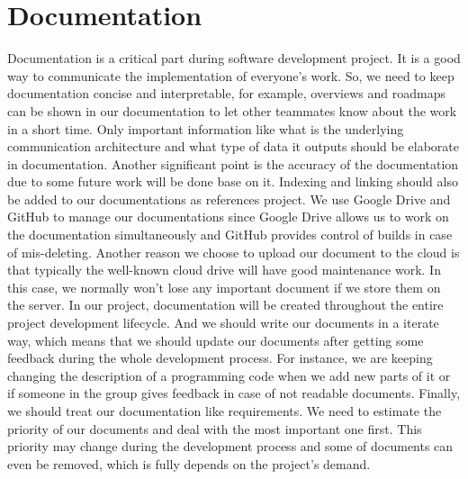 \documentclass[11pt, titlepage]{article} %
\begin{document}
\section{Documentation}
Documentation is a critical part during software development project. It is
a good way to communicate the implementation of everyone's work. So, we
need to keep documentation concise and interpretable, for example, overviews
and roadmaps can be shown in our documentation to let other teammates
know about the work in a short time. Only important information like what is
the underlying communication architecture and what type of data it outputs
should be elaborate in documentation. Another significant point is the
accuracy of the documentation due to some future work will be done base on
it. Indexing and linking should also be added to our documentations as
references project.
We use Google Drive and GitHub to manage our documentations since
Google Drive allows us to work on the documentation simultaneously and
GitHub provides control of builds in case of mis-deleting. Another reason we
choose to upload our document to the cloud is that typically the well-known
cloud drive will have good maintenance work. In this case, we normally won’t
lose any important document if we store them on the server.
In our project, documentation will be created throughout the entire project
development lifecycle. And we should write our documents in a iterate way,
which means that we should update our documents after getting some
feedback during the whole development process. For instance, we are
keeping changing the description of a programming code when we add new
parts of it or if someone in the group gives feedback in case of not
readable documents. Finally, we should treat our documentation like
requirements. We need to estimate the priority of our documents and deal
with the most important one first. This priority may change during the
development process and some of documents can even be removed, which
is fully depends on the project's demand.

\clearpage



\clearpage
\appendix
\end{document}
